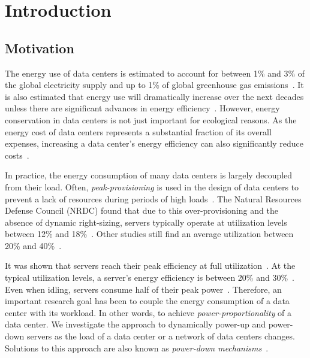 
\chapter{Introduction}\label{chapter:introduction}

\section{Motivation}

The energy use of data centers is estimated to account for between 1\% and 3\% of the global electricity supply and up to 1\% of global greenhouse gas emissions~\cite{Shehabi2016, Jones2018, Bashroush2020, Masanet2020}. It is also estimated that energy use will dramatically increase over the next decades unless there are significant advances in energy efficiency~\cite{Jones2018}. However, energy conservation in data centers is not just important for ecological reasons. As the energy cost of data centers represents a substantial fraction of its overall expenses, increasing a data center's energy efficiency can also significantly reduce costs~\cite{Barroso2007, Brill2007, Hamilton2008}.

In practice, the energy consumption of many data centers is largely decoupled from their load. Often, \emph{peak-provisioning} is used in the design of data centers to prevent a lack of resources during periods of high loads~\cite{Whitney2014}. The Natural Resources Defense Council (NRDC) found that due to this over-provisioning and the absence of dynamic right-sizing, servers typically operate at utilization levels between 12\% and 18\%~\cite{Whitney2014}. Other studies still find an average utilization between 20\% and 40\%~\cite{Barroso2007, Armbrust2010}.

It was shown that servers reach their peak efficiency at full utilization~\cite{Barroso2007}. At the typical utilization levels, a server's energy efficiency is between 20\% and 30\%~\cite{Barroso2007}. Even when idling, servers consume half of their peak power~\cite{Barroso2007}. Therefore, an important research goal has been to couple the energy consumption of a data center with its workload. In other words, to achieve \emph{power-proportionality} of a data center. We investigate the approach to dynamically power-up and power-down servers as the load of a data center or a network of data centers changes. Solutions to this approach are also known as \emph{power-down mechanisms}~\cite{Jin2016}.

